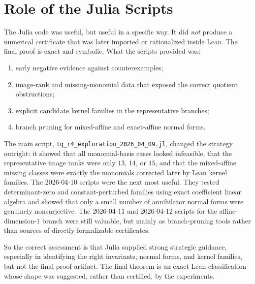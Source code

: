 \documentclass[10pt]{article}
\begin{document}
\section*{Role of the Julia Scripts}
The Julia code was useful, but useful in a specific way. It did \emph{not}
produce a numerical certificate that was later imported or rationalized inside
Lean. The final proof is exact and symbolic. What the scripts provided was:

\begin{enumerate}
\item early negative evidence against counterexamples;
\item image-rank and missing-monomial data that exposed the correct quotient
obstructions;
\item explicit candidate kernel families in the representative branches;
\item branch pruning for mixed-affine and exact-affine normal forms.
\end{enumerate}

The main script, \texttt{tq\_r4\_exploration\_2026\_04\_09.jl}, changed the
strategy outright: it showed that all monomial-basis cases looked infeasible,
that the representative image ranks were only $13$, $14$, or $15$, and that
the mixed-affine missing classes were exactly the monomials corrected later by
Lean kernel families. The 2026-04-10 scripts were the next most useful. They
tested determinant-zero and constant-perturbed families using exact coefficient
linear algebra and showed that only a small number of annihilator normal forms
were genuinely nonsurjective. The 2026-04-11 and 2026-04-12 scripts for the
affine-dimension-$1$ branch were still valuable, but mainly as branch-pruning
tools rather than sources of directly formalizable certificates.

So the correct assessment is that Julia supplied strong strategic guidance,
especially in identifying the right invariants, normal forms, and kernel
families, but not the final proof artifact. The final theorem is an exact Lean
classification whose shape was suggested, rather than certified, by the
experiments.
\end{document}

